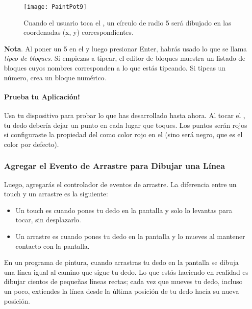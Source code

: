 \begin{enumerate}
\begin{figure}[H]
\vspace{3em}
\centering
\texttt{[image: PaintPot9]}
\caption{Cuando el usuario toca el , un
  círculo de radio 5 será dibujado en las coordenadas (x, y)
  correspondientes.}
\label{fig:PaintPot9}
\end{figure}

  \textbf{Nota}. Al poner un 5 en el \blockEditor y luego presionar
  Enter, habrás usado lo que se llama \emph{tipeo de bloques}. Si
  empiezas a tipear, el editor de bloques muestra un listado de
  bloques cuyos nombres corresponden a lo que estás tipeando. Si
  tipeas un número, crea un bloque numérico.

  \paragraph{Prueba tu Aplicación!} Usa tu dispositivo para probar lo
  que has desarrollado hasta ahora. Al tocar el
  , tu dedo debería dejar un punto en cada
  lugar que toques. Los puntos serán rojos si configuraste la
  propiedad del  como color
  rojo en el \designer (sino será negro, que es el color por defecto).

\end{enumerate}

\subsubsection*{Agregar el Evento de Arrastre para Dibujar una Línea}

Luego, agregarás el controlador de eventos de arrastre. La diferencia
entre un touch y un arrastre es la siguiente:
	
\begin{itemize}
\item Un touch es cuando pones tu dedo en la pantalla y solo lo
  levantas para tocar, sin desplazarlo.

\item Un arrastre es cuando pones tu dedo en la pantalla y lo mueves
  al mantener contacto con la pantalla.
\end{itemize}
	
En un programa de pintura, cuando arrastras tu dedo en la pantalla se
dibuja una línea igual al camino que sigue tu dedo. Lo que estás
haciendo en realidad es dibujar cientos de pequeñas líneas rectas;
cada vez que mueves tu dedo, incluso un poco, extiendes la línea desde
la última posición de tu dedo hacia su nueva posición.

